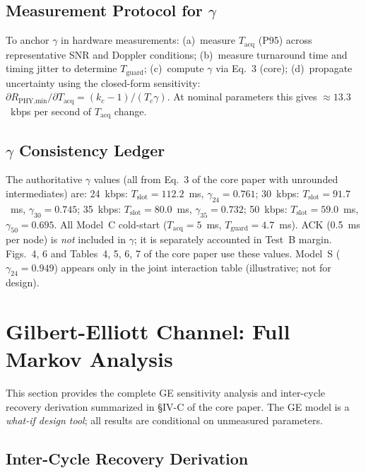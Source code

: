 \documentclass[journal]{IEEEtran}
\begin{document}
\subsection{Measurement Protocol for $\gamma$}

To anchor $\gamma$ in hardware measurements: (a)~measure $T_{\text{acq}}$ (P95) across representative SNR and Doppler conditions; (b)~measure turnaround time and timing jitter to determine $T_{\text{guard}}$; (c)~compute $\gamma$ via Eq.~3 (core); (d)~propagate uncertainty using the closed-form sensitivity: $\partial R_{\text{PHY,min}} / \partial T_{\text{acq}} = (k_c - 1)/(T_c \gamma)$. At nominal parameters this gives $\approx 13.3$~kbps per second of $T_{\text{acq}}$ change.

\subsection{$\gamma$ Consistency Ledger}

The authoritative $\gamma$ values (all from Eq.~3 of the core paper with unrounded intermediates) are: 24~kbps: $T_{\text{slot}}\!=\!112.2$~ms, $\gamma_{24}\!=\!0.761$; 30~kbps: $T_{\text{slot}}\!=\!91.7$~ms, $\gamma_{30}\!=\!0.745$; 35~kbps: $T_{\text{slot}}\!=\!80.0$~ms, $\gamma_{35}\!=\!0.732$; 50~kbps: $T_{\text{slot}}\!=\!59.0$~ms, $\gamma_{50}\!=\!0.695$. All Model~C cold-start ($T_{\text{acq}}\!=\!5$~ms, $T_{\text{guard}}\!=\!4.7$~ms). ACK (0.5~ms per node) is \emph{not} included in $\gamma$; it is separately accounted in Test~B margin. Figs.~4, 6 and Tables~4, 5, 6, 7 of the core paper use these values. Model~S ($\gamma_{24}\!=\!0.949$) appears only in the joint interaction table (illustrative; not for design).


\section{Gilbert-Elliott Channel: Full Markov Analysis}
\label{sec:supp-ge}

This section provides the complete GE sensitivity analysis and inter-cycle recovery derivation summarized in \S IV-C of the core paper. The GE model is a \emph{what-if design tool}; all results are conditional on unmeasured parameters.

\subsection{Inter-Cycle Recovery Derivation}
\end{document}
